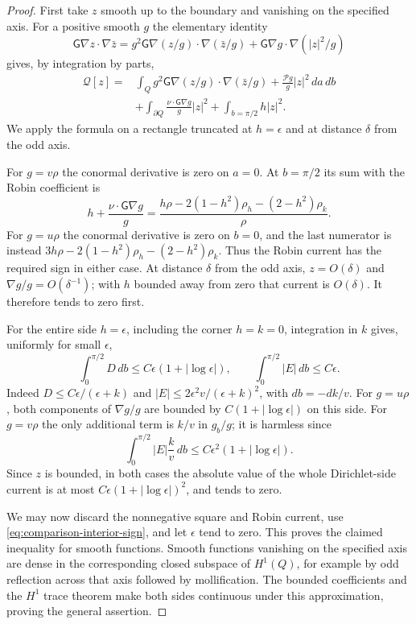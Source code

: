\documentclass[reqno,11pt]{amsart}
\numberwithin{equation}{section}
\theoremstyle{remark}
\begin{document}
\begin{proof}
First take $z$ smooth up to the boundary and vanishing on the
specified axis.  For a positive smooth $g$ the elementary identity
\[
 \mathsf G\nabla z\cdot\nabla\bar z
 =g^2\mathsf G\nabla(z/g)\cdot\nabla(\bar z/g)
  +\mathsf G\nabla g\cdot\nabla(|z|^2/g)
\]
gives, by integration by parts,
\begin{align*}
 \mathcal Q[z]
  ={}&\int_Q g^2\mathsf G\nabla(z/g)\cdot\nabla(\bar z/g)
       +\frac{\mathcal Pg}{g}|z|^2\,da\,db\\
    &+\int_{\partial Q}\frac{\nu\cdot\mathsf G\nabla g}{g}|z|^2
       +\int_{b=\pi/2}h|z|^2.
\end{align*}
We apply the formula on a rectangle truncated at $h=\epsilon$ and
at distance $\delta$ from the odd axis.

For $g=v\rho$ the conormal derivative is zero on $a=0$.
At $b=\pi/2$ its sum with the Robin coefficient is
\[
 h+\frac{\nu\cdot\mathsf G\nabla g}{g}
 =\frac{h\rho-2(1-h^2)\rho_h-(2-h^2)\rho_k}{\rho}.
\]
For $g=u\rho$ the conormal derivative is zero on $b=0$,
and the last numerator is instead
$3h\rho-2(1-h^2)\rho_h-(2-h^2)\rho_k$.
Thus the Robin current has the required sign in either case.
At distance $\delta$ from the odd axis,
$z=O(\delta)$ and $\nabla g/g=O(\delta^{-1})$;
with $h$ bounded away from zero that current is $O(\delta)$.
It therefore tends to zero first.

For the entire side $h=\epsilon$, including the corner $h=k=0$,
integration in $k$ gives, uniformly for small $\epsilon$,
\[
 \int_0^{\pi/2}D\,db
       \leq C\epsilon(1+|\log\epsilon|),\qquad
 \int_0^{\pi/2}|E|\,db\leq C\epsilon.
\]
Indeed $D\leq C\epsilon/(\epsilon+k)$ and
$|E|\leq2\epsilon^2v/(\epsilon+k)^2$, with $db=-dk/v$.
For $g=u\rho$, both components of $\nabla g/g$ are bounded
by $C(1+|\log\epsilon|)$ on this side.  For $g=v\rho$
the only additional term is $k/v$ in $g_b/g$; it is harmless since
\[
 \int_0^{\pi/2}|E|\frac{k}{v}\,db
      \leq C\epsilon^2(1+|\log\epsilon|).
\]
Since $z$ is bounded, in both cases the absolute value of the
whole Dirichlet-side current is at most
$C\epsilon(1+|\log\epsilon|)^2$, and tends to zero.


We may now discard the nonnegative square and Robin current,
use \eqref{eq:comparison-interior-sign}, and let
$\epsilon$ tend to zero. This proves the claimed inequality for
smooth functions.  Smooth functions vanishing on the specified axis
are dense in the corresponding closed subspace of $H^1(Q)$, for
example by odd reflection across that axis followed by mollification.
The bounded coefficients and the $H^1$ trace theorem make both sides
continuous under this approximation, proving the general assertion.
\end{proof}
\end{document}
